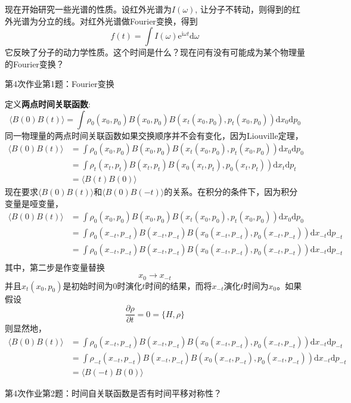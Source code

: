     现在开始研究一些光谱的性质。设红外光谱为$I(\omega)$, 让分子不转动，则得到的红外光谱为分立的线。对红外光谱做Fourier变换，得到
    \begin{equation*}
    f(t) = \int I(\omega)\mathrm{e}^{\mathrm{i}\omega t}\mathrm{d}\omega 
    \end{equation*}
    它反映了分子的动力学性质。这个时间是什么？现在问有没有可能成为某个物理量的Fourier变换？
    \begin{asg}
        第4次作业第1题：Fourier变换
    \end{asg}
    定义\textbf{两点时间关联函数}:
    \begin{equation*}
    \langle B(0)B(t) \rangle = \int \rho_0(x_0,p_0) B(x_0,p_0) B(x_t(x_0,p_0),p_t(x_0,p_0)) \mathrm{d}x_0 \mathrm{d}p_0
    \end{equation*}
    同一物理量的两点时间关联函数如果交换顺序并不会有变化，因为Liouville定理，
    \begin{align*}
    \langle B(0)B(t) \rangle &= \int \rho_0(x_0,p_0) B(x_0,p_0) B(x_t(x_0,p_0),p_t(x_0,p_0)) \mathrm{d}x_0 \mathrm{d}p_0\\
    &= \int \rho_t(x_t,p_t) B(x_t,p_t) B(x_0(x_t,p_t),p_0(x_t,p_t)) \mathrm{d}x_t \mathrm{d}p_t\\
    &= \langle B(t)B(0) \rangle
    \end{align*}
    现在要求$\langle B(0)B(t) \rangle$和$\langle B(0)B(-t) \rangle$的关系。在积分的条件下，因为积分变量是哑变量，
    \begin{align*}
    \langle B(0)B(t) \rangle &= \int \rho_0(x_0,p_0) B(x_0,p_0) B(x_t(x_0,p_0),p_t(x_0,p_0)) \mathrm{d}x_0 \mathrm{d}p_0\\
    &= \int \rho_0(x_{-t},p_{-t}) B(x_{-t},p_{-t}) B(x_0(x_{-t},p_{-t}),p_0(x_{-t},p_{-t})) \mathrm{d}x_{-t} \mathrm{d}p_{-t}\\
    &= \int \rho_0(x_{-t},p_{-t}) B(x_{-t},p_{-t}) B(x_0(x_{-t},p_{-t}),p_0(x_{-t},p_{-t})) \mathrm{d}x_{-t} \mathrm{d}p_{-t}\\
    \end{align*}
    其中，第二步是作变量替换
    \begin{equation*}
    x_0 \to x_{-t}
    \end{equation*}
    并且$x_t(x_0,p_0)$是初始时间为0时演化$t$时间的结果，而将$x_{-t}$演化$t$时间为$x_0$。如果假设
    \begin{equation*}
    \frac {\partial \rho}{\partial t} = 0 = \{ H, \rho\}
    \end{equation*}
    则显然地，
    \begin{align*}
        \langle B(0)B(t) \rangle &= \int \rho_0(x_{-t},p_{-t}) B(x_{-t},p_{-t}) B(x_0(x_{-t},p_{-t}),p_0(x_{-t},p_{-t})) \mathrm{d}x_{-t} \mathrm{d}p_{-t}\\
        &= \int \rho_{-t}(x_{-t},p_{-t}) B(x_{-t},p_{-t}) B(x_0(x_{-t},p_{-t}),p_0(x_{-t},p_{-t})) \mathrm{d}x_{-t} \mathrm{d}p_{-t}\\
        &= \langle B(-t)B(0) \rangle
    \end{align*}
    \begin{asg}
        第4次作业第2题：时间自关联函数是否有时间平移对称性？
    \end{asg}

